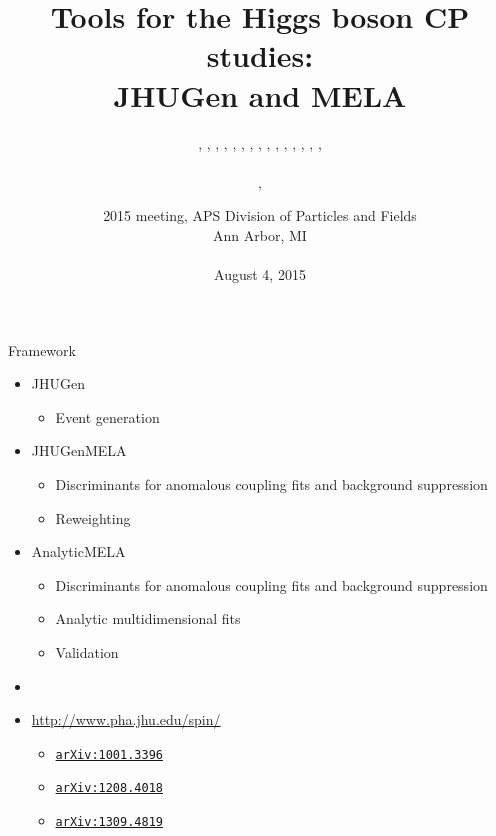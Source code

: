 \documentclass[usenames,dvipsnames,svgnames,table]{beamer}
\title[JHUGen and MELA]{Tools for the Higgs boson CP studies: \\ JHUGen and MELA}
\author[Heshy Roskes]{\CMS{I.~Anderson}, \CMS{S.~Bolognesi}, \theory{F.~Caola}, \ATLAS{Y.~Gao}, \CMS{A.~Gritsan}, \CMS{Z.~Guo}, \CMS{C.~Martin}, \theory{K.~Melnikov}, \me{Heshy~Roskes}, \CMS{U.~Sarica}, \theory{M.~Schulze}, \CMS{N.~Tran}, \CMS{A.~Whitbeck}, \CMS{M.~Xiao}, \CMS{C.~You}, \theory{Y.~Zhou}
\texorpdfstring{\\ \leavevmode
\\
\theory{Theory}, \experiment{experiment}}{}}
\date[August 4, 2015]{2015 meeting, APS Division of Particles and Fields\\
Ann Arbor, MI \\ \leavevmode \\
August 4, 2015}
\newcommand{\arxiv}[1]{\href{http://arxiv.org/abs/#1}{\nolinkurl{arXiv:#1}}}
\newcommand{\snowmass}{\arxiv{1309.4819}}
\begin{document}
\begin{frame}
\titlepage
\end{frame}

\begin{frame}{Framework}

\begin{itemize}
\small
\item JHUGen
\begin{itemize}
\item Event generation
\end{itemize}
\item JHUGenMELA
\begin{itemize}
\item Discriminants for anomalous coupling fits and background suppression
\item Reweighting
\end{itemize}
\item AnalyticMELA
\begin{itemize}
\item Discriminants for anomalous coupling fits and background suppression
\item Analytic multidimensional fits
\item Validation
\end{itemize}
\item
\item \url{http://www.pha.jhu.edu/spin/}
\begin{itemize}
\item \arxiv{1001.3396}
\item \arxiv{1208.4018}
\item \snowmass
\end{itemize}
\end{itemize}

\end{frame}
\end{document}

